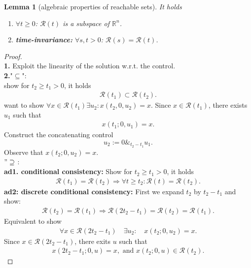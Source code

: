 \documentclass[a4paper,11pt,fleqn]{book}
\newtheorem{lemma}[theorem]{Lemma}
\theoremstyle{definition}
\theoremstyle{remark}
\begin{document}
\begin{lemma}[algebraic properties of reachable sets]
	It holds
	\begin{enumerate}
		\item $\forall t \ge 0$: $\mathcal{R}(t)$ is a subspace of $\mathbb{R}^n$. 
		\item \textbf{time-invariance:} $\forall s, t > 0$: $\mathcal{R}(s) = \mathcal{R}(t)$. 
	\end{enumerate}
\end{lemma}
\begin{proof}
\quad\\
\textbf{1.} Exploit the linearity of the solution w.r.t. the control. 
\quad\\
\textbf{2.}"$\subseteq$":\\
 show for $t_2 \ge t_1 > 0$, it holds
\begin{align*}
	\mathcal{R}(t_1) \subset \mathcal{R}(t_2). 
\end{align*}
want to show $\forall x \in \mathcal{R}(t_1) \exists u_2 : x(t_2, 0, u_2) = x$. Since $x \in \mathcal{R}(t_1)$, there exists $u_1$ such that 
\begin{align*}
	x(t_1; 0, u_1) = x.
\end{align*}
Construct the concatenating control
\begin{equation}
	u_2:= 0 \&_{t_2 - t_1} u_1. 
\end{equation} 
Observe that $x(t_2; 0, u_2) = x$. 
\quad\\
$"\supseteq$ :\\
\textbf{ad1. conditional consistency:} Show for $t_2 \ge t_1 > 0$, it holds
\begin{align*}
	\mathcal{R}(t_1) = \mathcal{R}(t_2) \Rightarrow \forall t \ge t_2: \mathcal{R}(t) = \mathcal{R}(t_2). 
\end{align*}
\textbf{ad2: discrete conditional consistency: }First we expand $t_2$ by $t_2 - t_1$ and show:
\begin{align*}
	\mathcal{R}(t_2) = \mathcal{R}(t_1) \Rightarrow \mathcal{R}(2t_2 - t_1) = \mathcal{R}(t_2) = \mathcal{R}(t_1). 
\end{align*} 
Equivalent to show
\begin{align*}
	\forall x \in \mathcal{R}(2t_2 - t_1) \quad \exists u_2: \quad x(t_2; 0, u_2) = x.
\end{align*}
Since $x \in \mathcal{R}(2t_2 - t_1)$, there exits $u$ such that
\begin{align*}
	x(2 t_2 - t_1; 0, u ) = x , \text{ and } x(t_2;0, u) \in \mathcal{R}(t_2). 

\end{align*}
\end{proof}
\end{document}
